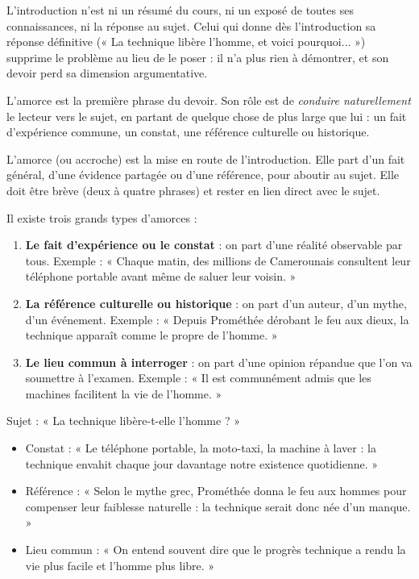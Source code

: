 \documentclass[11pt]{article}
\newcommand{\cle}[1]{{\popxbold\color{popdark}#1}}
\newcounter{popsec}
\newcounter{popsub}
\newcommand{\courssub}[1]{%
  \stepcounter{popsub}%
  \par\vspace{9pt}\noindent{\popxbold\fontsize{11.5}{13}\selectfont\color{popink}{\color{poporange}\thepopsec.\thepopsub}\hspace{6pt}#1}\par\nopagebreak\vspace{4pt}
}
\begin{document}
\begin{attention}
L'introduction n'est ni un résumé du cours, ni un exposé de toutes ses connaissances, ni la réponse au sujet. Celui qui donne dès l'introduction sa réponse définitive (« La technique libère l'homme, et voici pourquoi... ») supprime le problème au lieu de le poser : il n'a plus rien à démontrer, et son devoir perd sa dimension argumentative.
\end{attention}

\courssub{Première étape : l'amorce ou l'accroche}

L'amorce est la première phrase du devoir. Son rôle est de \emph{conduire naturellement} le lecteur vers le sujet, en partant de quelque chose de plus large que lui : un fait d'expérience commune, un constat, une référence culturelle ou historique.

\begin{definition}[L'amorce]
L'\cle{amorce} (ou accroche) est la mise en route de l'introduction. Elle part d'un fait général, d'une évidence partagée ou d'une référence, pour aboutir au sujet. Elle doit être brève (deux à quatre phrases) et rester en lien direct avec le sujet.
\end{definition}

Il existe trois grands types d'amorces :
\begin{enumerate}
\item \textbf{Le fait d'expérience ou le constat} : on part d'une réalité observable par tous. Exemple : « Chaque matin, des millions de Camerounais consultent leur téléphone portable avant même de saluer leur voisin. »
\item \textbf{La référence culturelle ou historique} : on part d'un auteur, d'un mythe, d'un événement. Exemple : « Depuis Prométhée dérobant le feu aux dieux, la technique apparaît comme le propre de l'homme. »
\item \textbf{Le lieu commun à interroger} : on part d'une opinion répandue que l'on va soumettre à l'examen. Exemple : « Il est communément admis que les machines facilitent la vie de l'homme. »
\end{enumerate}

\begin{exemplebox}
Sujet : « La technique libère-t-elle l'homme ? »
\begin{itemize}
\item Constat : « Le téléphone portable, la moto-taxi, la machine à laver : la technique envahit chaque jour davantage notre existence quotidienne. »
\item Référence : « Selon le mythe grec, Prométhée donna le feu aux hommes pour compenser leur faiblesse naturelle : la technique serait donc née d'un manque. »
\item Lieu commun : « On entend souvent dire que le progrès technique a rendu la vie plus facile et l'homme plus libre. »
\end{itemize}
\end{exemplebox}
\end{document}
